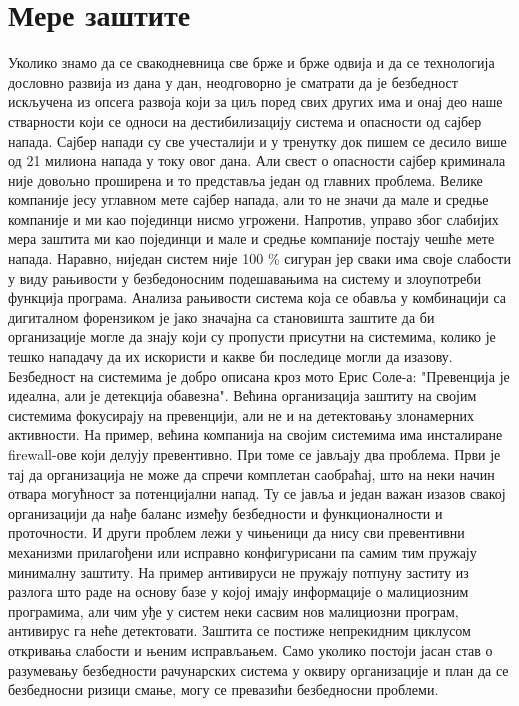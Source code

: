 \documentclass[a4paper]{article}
\begin{document}
	\section{Мере заштите}
	\label{sec:MereZastite}
	Уколико знамо да се свакодневница све брже и брже одвија и да се технологија дословно развија из дана у дан, неодговорно је сматрати да је безбедност искључена из опсега развоја који за циљ поред свих других има и онај део наше стварности који се односи на дестибилизацију система и опасности од сајбер напада. Сајбер напади су све учесталији и у тренутку док пишем се десило више од 21 милиона напада у току овог дана. Али свест о опасности сајбер крими\-нала није довољно проширена и то представља један од главних пробле\-ма. Велике компаније јесу углавном мете сајбер напада, али то не значи да мале и средње компаније и ми као појединци нисмо угрожени. Напротив, управо због слабијих мера заштита ми као појединци и мале и средње компаније постају чешће мете напада. \newline
   	Наравно, ниједан систем није 100 \% сигуран јер сваки има своје слабо\-сти у виду рањивости у безбедоносним подешавањима на систему и
	злоупо\-треби функција програма. Анализа рањивости система која се обавља у комбинацији са дигиталном форензиком је јако значајна са
	станови\-шта заштите  да би организације могле да знају који су 
	пропусти присутни на системима, колико је тешко нападачу да их искористи и какве би последице могли да изазову. Безбедност на систе\-мима је добро описана кроз мото Ерис Соле-а: "Превенција је идеална, али је детекција обавезна". Већина организација заштиту на својим системима фокусира\-ју на превенцији, али не и на детектовању злона\-мерних активности. На пример, већина компанија на својим системима има инсталиране firewall-ове који делују превентивно. При томе се јављају два проблема. Први је тај да организација не може да спречи комплетан саобраћај, што на неки начин отвара могућност за потенци\-јални напад. Ту се јавља и један важан изазов свакој организацији да нађе баланс између безбедности и функционалности и проточности. И други проблем лежи у чињеници да нису сви превентивни механизми прилагођени или исправно конфигурисани па самим тим пружају мини\-малну заштиту. На пример антивируси не пружају потпуну заститу из разлога што раде на основу базе у којој имају информације о малициозним програми\-ма, али чим уђе у систем неки сасвим нов малициозни програм, антивирус га неће детектовати. Заштита се пости\-же непрекидним циклусом откривања слабости и њеним исправљањем. Само уколико постоји јасан став о разумевању безбедности рачунар\-ских система у оквиру организације и план да се безбедносни ризици смање, могу се превазићи безбедносни проблеми. 
\end{document}
